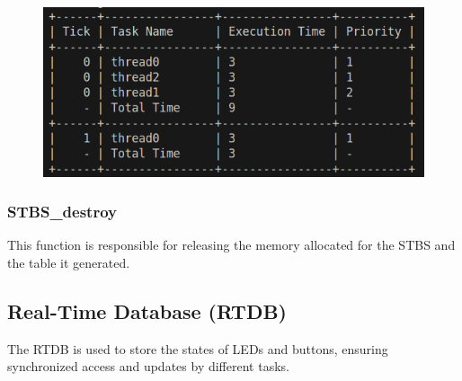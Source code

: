 \documentclass[a4paper,12pt]{article}
\begin{document}
\begin{figure}[H]
    \centering
    \includegraphics[width=0.91\linewidth]{STBS_table.png}
    \label{fig:gantt}
\end{figure}

\subsubsection{STBS\_destroy}
This function is responsible for releasing the memory allocated for the STBS and the table it generated.

\subsection{Real-Time Database (RTDB)}
The RTDB is used to store the states of LEDs and buttons, ensuring synchronized access and updates by different tasks.

\end{document}

